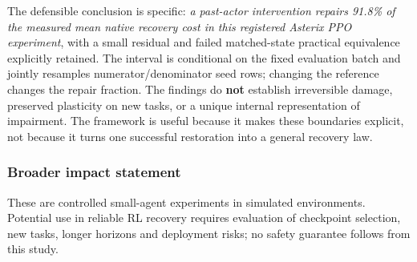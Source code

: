 \documentclass[10pt]{article}
\begin{document}
The defensible conclusion is specific: \emph{a past-actor intervention repairs 91.8\% of the measured mean native recovery cost in this registered Asterix PPO experiment}, with a small residual and failed matched-state practical equivalence explicitly retained. The interval is conditional on the fixed evaluation batch and jointly resamples numerator/denominator seed rows; changing the reference changes the repair fraction. The findings do \textbf{not} establish irreversible damage, preserved plasticity on new tasks, or a unique internal representation of impairment. The framework is useful because it makes these boundaries explicit, not because it turns one successful restoration into a general recovery law.

\subsubsection*{Broader impact statement}
These are controlled small-agent experiments in simulated environments. Potential use in reliable RL recovery requires evaluation of checkpoint selection, new tasks, longer horizons and deployment risks; no safety guarantee follows from this study.




\end{document}
